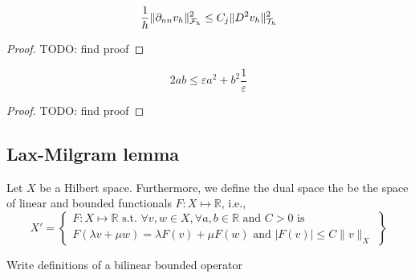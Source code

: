 \begin{lemma}
    \[
     \frac{1}{h}\| \partial _{nn}  v_{h} \|_{\mathcal{F}_{h}   }^{2  }  \le C_{j} \| D ^2 v_{h} \|_{ \mathcal{T} _{h} }^{ 2 }   \\
    \]

\end{lemma}
\begin{proof}
    TODO: find proof
\end{proof}
\begin{lemma}
    \label{lemma:youngs_epsilon}
   \[
     2ab \le \varepsilon a^2+ b^2 \frac{1}{\varepsilon }
   \]
\end{lemma}
\begin{proof}
    TODO: find proof
\end{proof}



\subsection{Lax-Milgram lemma}%
\label{sub:lax_milgram_lemma}


\begin{definition}
    \label{def:linear_function}
Let $X$ be a Hilbert space. Furthermore, we define the dual space the be the space of linear and bounded functionals $F: X  \mapsto \mathbb{R} $, i.e., \[
X'  =
\left.
\begin{cases}
F: X  \mapsto \mathbb{R} \text{ s.t. }\forall v,w \in X, \forall a,b \in \mathbb{R} \text{ and } C> 0 \text{ is }   \\
  F\left( \lambda v + \mu w  \right) = \lambda F(v) + \mu F(w) \text{ and } \left\lvert F\left( v \right)  \right\rvert \le C \| v \|_{ X  }^{  }
\end{cases}
  \right\}
\]
\end{definition}

\begin{definition}
    \label{def:bilinear_function}
    Write definitions of a bilinear bounded operator
\end{definition}

